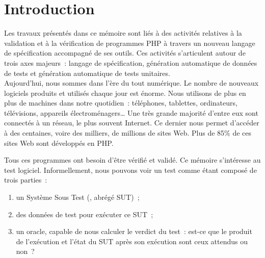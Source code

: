 \chapter{Introduction}
\label{chapter:introduction}

\minitoc

Les travaux présentés dans ce mémoire sont liés à des activités relatives à la
validation et à la vérification de programmes PHP à travers un nouveau langage
de spécification accompagné de ses outils. Ces activités s'articulent autour de
trois axes majeurs~: langage de spécification, génération automatique de données
de tests et génération automatique de tests unitaires. \\

Aujourd'hui, nous sommes dans l'ère du tout numérique. Le nombre de nouveaux
logiciels produits et utilisés chaque jour est énorme. Nous utilisons de plus en
plus de machines dans notre quotidien~: téléphones, tablettes, ordinateurs,
télévisions, appareils électroménagers… Une très grande majorité d'entre eux
sont connectés à un réseau, le plus souvent Internet. Ce dernier nous permet
d'accéder à des centaines, voire des milliers, de millions de sites Web. Plus de
85\% de ces sites Web sont développés en PHP.

Tous ces programmes ont besoin d'être vérifié et validé. Ce mémoire s'intéresse
au test logiciel. Informellement, nous pouvons voir un test comme étant composé
de trois parties~:
%
\begin{enumerate}

\item un Système Sous Test (, abrégé {\strong
SUT})~;

\item des {\strong données de test} pour exécuter ce SUT~;

\item un {\strong oracle}, capable de nous calculer le verdict du test~: est-ce
que le produit de l'exécution et l'état du SUT après son exécution sont ceux
attendus ou non~?

\end{enumerate}

